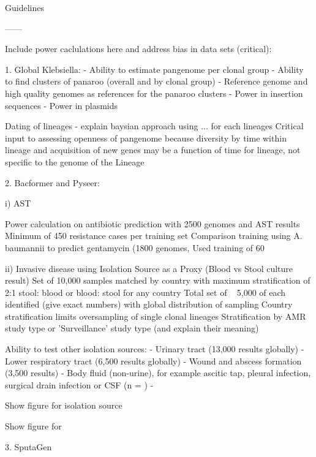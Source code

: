 Guidelines


------

Include power caclulations here and address bias in data sets (critical):

1.   Global Klebsiella:
-  Ability to estimate pangenome per clonal group
-  Ability to find clusters of panaroo (overall and by clonal group)
-  Reference genome and high quality genomes as references for the panaroo clusters
-  Power in insertion sequences
-  Power in plasmids

Dating of lineages - explain baysian approach using ... for each lineages
Critical input to assessing openness of pangenome because diversity by time within lineage and acquisition of new genes may be a function of time for lineage, not specific to the genome of the Lineage



2.   Bacformer and Pyseer:

i) AST 

Power calculation on antibiotic prediction with 2500 genomes and AST results
Minimum of 450 resistance cases per training set
Comparison training using A. baumannii to predict gentamycin (1800 genomes, Used training of 60%


ii)  Invasive disease using Isolation Source as a Proxy (Blood vs Stool culture result)
Set of 10,000 samples matched by country with maximum stratification of 2:1 stool: blood or blood: stool for any country
Total set of ~ 5,000 of each identified (give exact numbers) with global distribution of sampling
Country stratification limits oversampling of single clonal lineages
Stratification by AMR study type or 'Surveillance' study type (and explain their meaning)

Ability to test other isolation sources:
-  Urinary tract (13,000 results globally)
-  Lower respiratory tract (6,500 results globally)
-  Wound and abscess formation (3,500 results)
-  Body fluid (non-urine), for example ascitic tap, pleural infection, surgical drain infection or CSF (n = )
-  

Show figure for isolation source

Show figure for 



3.  SputaGen
